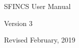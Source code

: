 \begin{center}

\vspace*{2in}

{\Huge SFINCS User Manual}

\vspace{4in}

{\Large Version 3}

\vspace{0.5in}



Revised February, 2019

\end{center}

